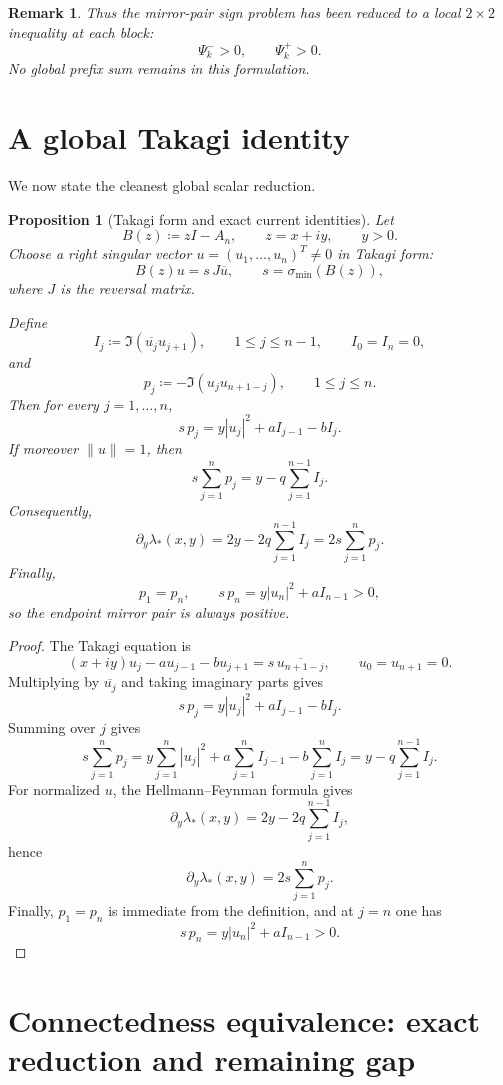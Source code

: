 \documentclass[11pt]{article}
\newtheorem{proposition}[theorem]{Proposition}
\newtheorem{remark}[theorem]{Remark}
\begin{document}
\begin{remark}
Thus the mirror-pair sign problem has been reduced to a local \(2\times2\) inequality at each
block:
\[
\Psi_k^- >0,\qquad \Psi_k^+>0.
\]
No global prefix sum remains in this formulation.
\end{remark}

\section{A global Takagi identity}

We now state the cleanest global scalar reduction.

\begin{proposition}[Takagi form and exact current identities]\label{prop:Takagi}
Let
\[
B(z)\coloneqq zI-A_n,
\qquad
z=x+iy,
\qquad
y>0.
\]
Choose a right singular vector \(u=(u_1,\dots,u_n)^T\neq 0\) in Takagi form:
\[
B(z)u=s\,J\overline{u},
\qquad
s=\sigma_{\min}(B(z)),
\]
where \(J\) is the reversal matrix.

Define
\[
I_j\coloneqq \Im(\overline{u_j}u_{j+1}),
\qquad
1\le j\le n-1,
\qquad
I_0=I_n=0,
\]
and
\[
p_j\coloneqq -\Im(u_j u_{n+1-j}),
\qquad
1\le j\le n.
\]
Then for every \(j=1,\dots,n\),
\[
s\,p_j
=
y|u_j|^2+a I_{j-1}-b I_j.
\]
If moreover \(\|u\|=1\), then
\[
s\sum_{j=1}^n p_j
=
y-q\sum_{j=1}^{n-1} I_j.
\]
Consequently,
\[
\partial_y \lambda_*(x,y)
=
2y-2q\sum_{j=1}^{n-1} I_j
=
2s\sum_{j=1}^n p_j.
\]
Finally,
\[
p_1=p_n,
\qquad
s\,p_n=y|u_n|^2+a I_{n-1}>0,
\]
so the endpoint mirror pair is always positive.
\end{proposition}

\begin{proof}
The Takagi equation is
\[
(x+iy)u_j-a u_{j-1}-b u_{j+1}=s\,\overline{u_{n+1-j}},
\qquad
u_0=u_{n+1}=0.
\]
Multiplying by \(\overline{u_j}\) and taking imaginary parts gives
\[
s\,p_j=y|u_j|^2+a I_{j-1}-b I_j.
\]
Summing over \(j\) gives
\[
s\sum_{j=1}^n p_j
=
y\sum_{j=1}^n |u_j|^2
+a\sum_{j=1}^n I_{j-1}
-b\sum_{j=1}^n I_j
=
y-q\sum_{j=1}^{n-1} I_j.
\]
For normalized \(u\), the Hellmann--Feynman formula gives
\[
\partial_y \lambda_*(x,y)=2y-2q\sum_{j=1}^{n-1}I_j,
\]
hence
\[
\partial_y \lambda_*(x,y)=2s\sum_{j=1}^n p_j.
\]
Finally, \(p_1=p_n\) is immediate from the definition, and at \(j=n\) one has
\[
s\,p_n=y|u_n|^2+a I_{n-1}>0.
\]
\end{proof}

\section{Connectedness equivalence: exact reduction and remaining gap}
\end{document}
